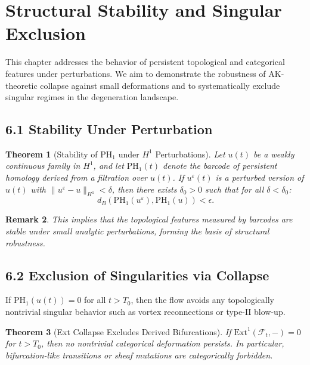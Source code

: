 \documentclass[11pt]{article}
\newtheorem{theorem}{Theorem}[section]
\newtheorem{remark}[theorem]{Remark}
\begin{document}
\section{Structural Stability and Singular Exclusion}

This chapter addresses the behavior of persistent topological and categorical features under perturbations. We aim to demonstrate the robustness of AK-theoretic collapse against small deformations and to systematically exclude singular regimes in the degeneration landscape.

\subsection{6.1 Stability Under Perturbation}

\begin{theorem}[Stability of PH$_1$ under $H^1$ Perturbations]
Let $u(t)$ be a weakly continuous family in $H^1$, and let $\mathrm{PH}_1(t)$ denote the barcode of persistent homology derived from a filtration over $u(t)$. If $u^\varepsilon(t)$ is a perturbed version of $u(t)$ with $\|u^\varepsilon - u\|_{H^1} < \delta$, then there exists $\delta_0 > 0$ such that for all $\delta < \delta_0$:
\[
d_B(\mathrm{PH}_1(u^\varepsilon), \mathrm{PH}_1(u)) < \epsilon.
\]
\end{theorem}

\begin{remark}
This implies that the topological features measured by barcodes are stable under small analytic perturbations, forming the basis of structural robustness.
\end{remark}

\subsection{6.2 Exclusion of Singularities via Collapse}

\begin{proposition}
If $\mathrm{PH}_1(u(t)) = 0$ for all $t > T_0$, then the flow avoids any topologically nontrivial singular behavior such as vortex reconnections or type-II blow-up.
\end{proposition}

\begin{theorem}[Ext Collapse Excludes Derived Bifurcations]
If $\mathrm{Ext}^1(\mathcal{F}_t, -) = 0$ for $t > T_0$, then no nontrivial categorical deformation persists. In particular, bifurcation-like transitions or sheaf mutations are categorically forbidden.
\end{theorem}
\end{document}
